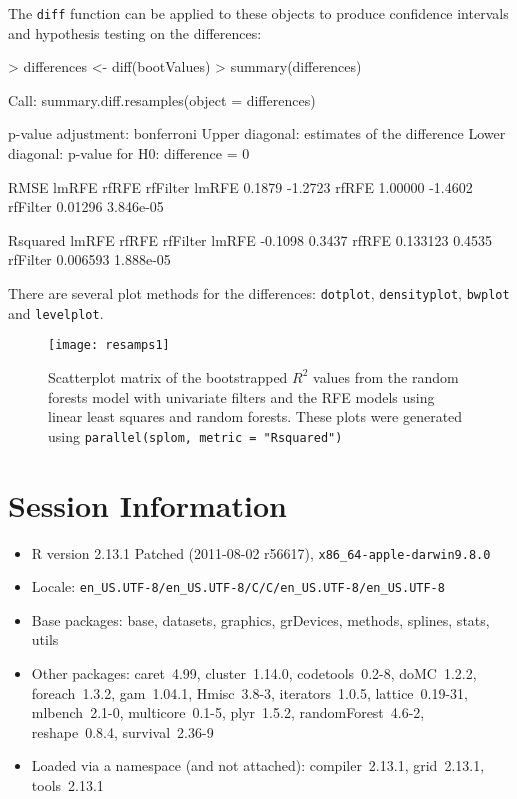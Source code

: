 \documentclass[12pt]{article}
\begin{document}
The \texttt{diff} function can be applied to these objects to produce
confidence intervals and hypothesis testing on the differences:
\begin{Schunk}
\begin{Sinput}
> differences <- diff(bootValues)
> summary(differences)
\end{Sinput}
\begin{Soutput}
Call:
summary.diff.resamples(object = differences)

p-value adjustment: bonferroni 
Upper diagonal: estimates of the difference
Lower diagonal: p-value for H0: difference = 0

RMSE 
         lmRFE   rfRFE     rfFilter
lmRFE             0.1879   -1.2723 
rfRFE    1.00000           -1.4602 
rfFilter 0.01296 3.846e-05         

Rsquared 
         lmRFE    rfRFE     rfFilter
lmRFE             -0.1098    0.3437 
rfRFE    0.133123            0.4535 
rfFilter 0.006593 1.888e-05         
\end{Soutput}
\end{Schunk}
There are several plot methods for the differences: 
\texttt{dotplot}, \texttt{densityplot}, \texttt{bwplot} and
\texttt{levelplot}. 

\begin{figure}
   \begin{center}		
      \texttt{[image: resamps1]}
      \caption{Scatterplot matrix of the bootstrapped $R^2$ values
        from the random forests model with univariate filters and the RFE models using linear least squares and random forests. These plots were generated using \texttt{parallel(splom, metric = "Rsquared")}}
      \label{F:resamps1} 
    \end{center}
\end{figure}


\section{Session Information}

\begin{itemize}\raggedright
  \item R version 2.13.1 Patched (2011-08-02 r56617), \verb|x86_64-apple-darwin9.8.0|
  \item Locale: \verb|en_US.UTF-8/en_US.UTF-8/C/C/en_US.UTF-8/en_US.UTF-8|
  \item Base packages: base, datasets, graphics, grDevices, methods,
    splines, stats, utils
  \item Other packages: caret~4.99, cluster~1.14.0, codetools~0.2-8,
    doMC~1.2.2, foreach~1.3.2, gam~1.04.1, Hmisc~3.8-3,
    iterators~1.0.5, lattice~0.19-31, mlbench~2.1-0, multicore~0.1-5,
    plyr~1.5.2, randomForest~4.6-2, reshape~0.8.4, survival~2.36-9
  \item Loaded via a namespace (and not attached): compiler~2.13.1,
    grid~2.13.1, tools~2.13.1
\end{itemize}
\end{document}
